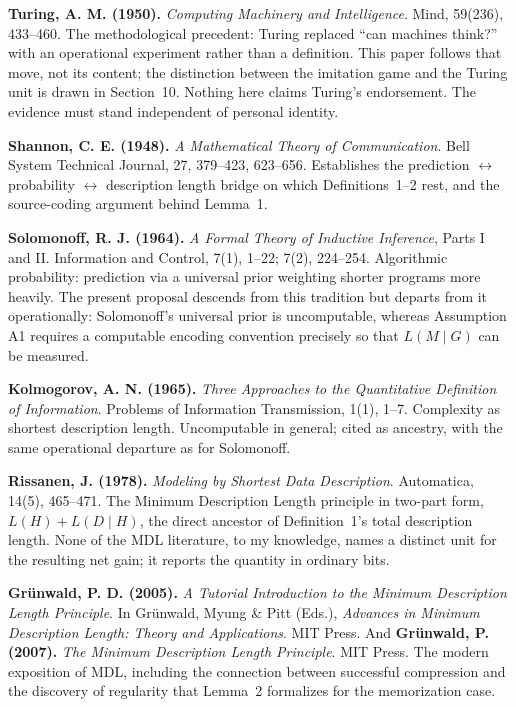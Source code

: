 \documentclass[11pt]{article}
\begin{document}
\textbf{Turing, A. M. (1950).} \textit{Computing Machinery and Intelligence}. Mind, 59(236), 433--460. The methodological precedent: Turing replaced ``can machines think?'' with an operational experiment rather than a definition. This paper follows that move, not its content; the distinction between the imitation game and the Turing unit is drawn in Section~10. Nothing here claims Turing's endorsement. The evidence must stand independent of personal identity.

\textbf{Shannon, C. E. (1948).} \textit{A Mathematical Theory of Communication}. Bell System Technical Journal, 27, 379--423, 623--656. Establishes the prediction \(\leftrightarrow\) probability \(\leftrightarrow\) description length bridge on which Definitions~1--2 rest, and the source-coding argument behind Lemma~1.

\textbf{Solomonoff, R. J. (1964).} \textit{A Formal Theory of Inductive Inference}, Parts I and II. Information and Control, 7(1), 1--22; 7(2), 224--254. Algorithmic probability: prediction via a universal prior weighting shorter programs more heavily. The present proposal descends from this tradition but departs from it operationally: Solomonoff's universal prior is uncomputable, whereas Assumption A1 requires a computable encoding convention precisely so that \(L(M\mid G)\) can be measured.

\textbf{Kolmogorov, A. N. (1965).} \textit{Three Approaches to the Quantitative Definition of Information}. Problems of Information Transmission, 1(1), 1--7. Complexity as shortest description length. Uncomputable in general; cited as ancestry, with the same operational departure as for Solomonoff.

\textbf{Rissanen, J. (1978).} \textit{Modeling by Shortest Data Description}. Automatica, 14(5), 465--471. The Minimum Description Length principle in two-part form, \(L(H)+L(D\mid H)\), the direct ancestor of Definition~1's total description length. None of the MDL literature, to my knowledge, names a distinct unit for the resulting net gain; it reports the quantity in ordinary bits.

\textbf{Gr{\"u}nwald, P. D. (2005).} \textit{A Tutorial Introduction to the Minimum Description Length Principle}. In Gr{\"u}nwald, Myung \& Pitt (Eds.), \textit{Advances in Minimum Description Length: Theory and Applications}. MIT Press. And \textbf{Gr{\"u}nwald, P. (2007).} \textit{The Minimum Description Length Principle}. MIT Press. The modern exposition of MDL, including the connection between successful compression and the discovery of regularity that Lemma~2 formalizes for the memorization case.
\end{document}
